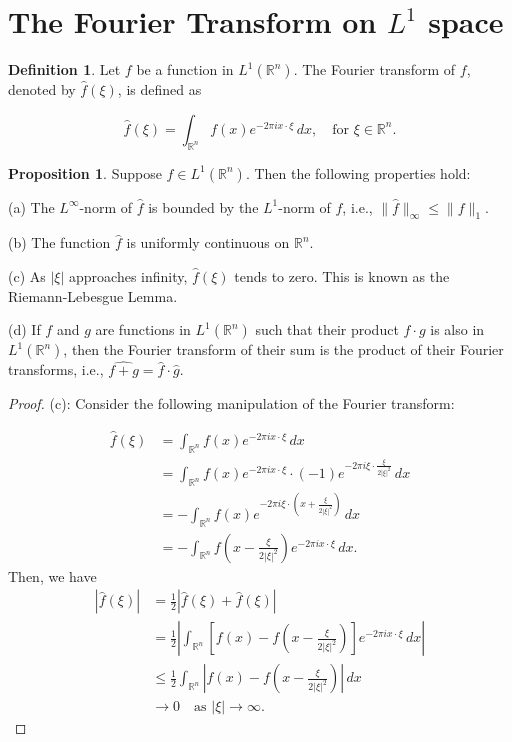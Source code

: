 \documentclass[12pt,openany]{book}
\theoremstyle{definition}
\newtheorem{definition}[theorem]{Definition}
\newtheorem{proposition}[theorem]{Proposition}
\begin{document}
\section{The Fourier Transform on $L^1$ space}
\begin{definition}
    Let $f$ be a function in $L^{1}\left(\mathbb{R}^n\right)$. The Fourier transform of $f$, denoted by $\hat{f}(\xi)$, is defined as

$$\hat{f}(\xi)=\int_{\mathbb{R}^n} f(x) e^{-2 \pi i x \cdot \xi} \, dx, \quad \text{for } \xi \in \mathbb{R}^n.$$
\end{definition}
\begin{proposition}
    Suppose $f \in L^{1}\left(\mathbb{R}^n\right)$. Then the following properties hold:

(a) The $L^{\infty}$-norm of $\hat{f}$ is bounded by the $L^{1}$-norm of $f$, i.e., $\|\hat{f}\|_{\infty} \leqslant\|f\|_1$.

(b) The function $\hat{f}$ is uniformly continuous on $\mathbb{R}^n$.

(c) As $|\xi|$ approaches infinity, $\hat{f}(\xi)$ tends to zero. This is known as the Riemann-Lebesgue Lemma.

(d) If $f$ and $g$ are functions in $L^{1}\left(\mathbb{R}^n\right)$ such that their product $f \cdot g$ is also in $L^{1}\left(\mathbb{R}^n\right)$, then the Fourier transform of their sum is the product of their Fourier transforms, i.e., $\widehat{f+g}=\hat{f} \cdot \hat{g}$.
\end{proposition}
\begin{proof}
    (c):
Consider the following manipulation of the Fourier transform:

$$\begin{aligned}
\hat{f}(\xi) &= \int_{\mathbb{R}^n} f(x) e^{-2 \pi i x \cdot \xi} \, dx \\
&= \int_{\mathbb{R}^n} f(x) e^{-2 \pi i x \cdot \xi} \cdot (-1) e^{-2 \pi i \xi \cdot \frac{\xi}{2|\xi|^2}} \, dx \\
&= -\int_{\mathbb{R}^n} f(x) e^{-2 \pi i \xi \cdot \left(x + \frac{\xi}{2|\xi|^2}\right)} \, dx \\
&= -\int_{\mathbb{R}^n} f\left(x - \frac{\xi}{2|\xi|^2}\right) e^{-2 \pi i x \cdot \xi} \, dx.
\end{aligned}$$
Then, we have
$$\begin{aligned}
|\hat{f}(\xi)| &= \frac{1}{2}|\hat{f}(\xi) + \hat{f}(\xi)| \\
&= \frac{1}{2}\left|\int_{\mathbb{R}^n} \left[f(x) - f\left(x - \frac{\xi}{2|\xi|^2}\right)\right] e^{-2 \pi i x \cdot \xi} \, dx\right| \\
&\leqslant \frac{1}{2} \int_{\mathbb{R}^n} \left|f(x) - f\left(x - \frac{\xi}{2|\xi|^2}\right)\right| \, dx \\
&\rightarrow 0 \quad \text{as } |\xi| \rightarrow \infty.
\end{aligned}$$

\end{proof}
\end{document}
